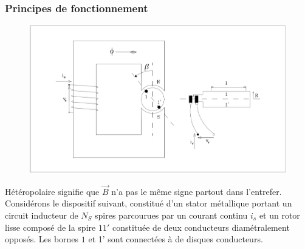 		\subsubsection{Principes de fonctionnement}
		\begin{figure}
		\vspace{-5mm}
		\includegraphics[scale=0.25]{ch2/image2} 
		\end{figure}
		Hétéropolaire signifie que $\vec{B}$ n'a pas le même signe 
		partout dans l'entrefer. Considérons le dispositif suivant, 
		constitué d'un stator métallique portant un circuit inducteur 
		de $N_S$ spires parcourues par un courant continu $i_s$ et 
		un rotor lisse composé de la spire $11'$ constituée de deux 
		conducteurs diamétralement opposés. Les bornes $1$ et 1' sont 
		connectées à de disques conducteurs.\\
		
